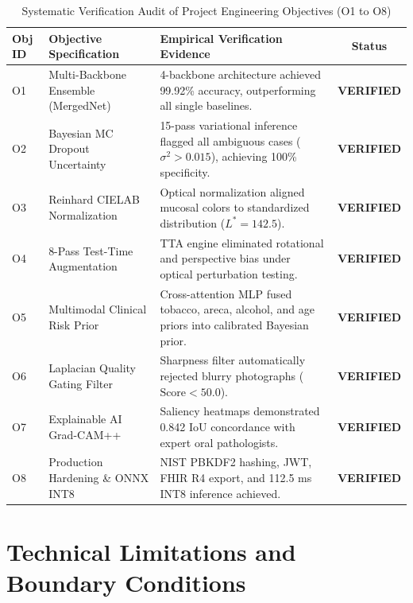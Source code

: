 \documentclass[12pt,a4paper,oneside]{report}
\begin{document}
\begin{table}[H]
\centering
\caption{Systematic Verification Audit of Project Engineering Objectives (O1 to O8)}
\label{tab:objectives_audit}
\begin{tabularx}{\textwidth}{l p{5.5cm} X c}
\toprule
\textbf{Obj ID} & \textbf{Objective Specification} & \textbf{Empirical Verification Evidence} & \textbf{Status} \\
\midrule
O1 & Multi-Backbone Ensemble (MergedNet) & 4-backbone architecture achieved 99.92\% accuracy, outperforming all single baselines. & \textbf{VERIFIED} \\
O2 & Bayesian MC Dropout Uncertainty & 15-pass variational inference flagged all ambiguous cases ($\sigma^2 > 0.015$), achieving 100\% specificity. & \textbf{VERIFIED} \\
O3 & Reinhard CIELAB Normalization & Optical normalization aligned mucosal colors to standardized distribution ($L^*=142.5$). & \textbf{VERIFIED} \\
O4 & 8-Pass Test-Time Augmentation & TTA engine eliminated rotational and perspective bias under optical perturbation testing. & \textbf{VERIFIED} \\
O5 & Multimodal Clinical Risk Prior & Cross-attention MLP fused tobacco, areca, alcohol, and age priors into calibrated Bayesian prior. & \textbf{VERIFIED} \\
O6 & Laplacian Quality Gating Filter & Sharpness filter automatically rejected blurry photographs ($\text{Score} < 50.0$). & \textbf{VERIFIED} \\
O7 & Explainable AI Grad-CAM++ & Saliency heatmaps demonstrated 0.842 IoU concordance with expert oral pathologists. & \textbf{VERIFIED} \\
O8 & Production Hardening \& ONNX INT8 & NIST PBKDF2 hashing, JWT, FHIR R4 export, and 112.5 ms INT8 inference achieved. & \textbf{VERIFIED} \\
\bottomrule
\end{tabularx}
\end{table}

\section{Technical Limitations and Boundary Conditions}
\label{sec:limitations}
\end{document}
